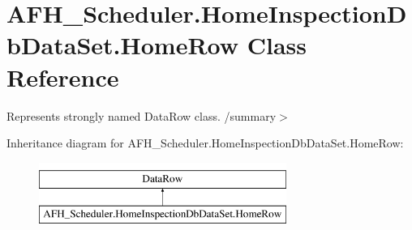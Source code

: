\section{A\+F\+H\+\_\+\+Scheduler.\+Home\+Inspection\+Db\+Data\+Set.\+Home\+Row Class Reference}
\label{class_a_f_h___scheduler_1_1_home_inspection_db_data_set_1_1_home_row}


Represents strongly named Data\+Row class. /summary$>$  


Inheritance diagram for A\+F\+H\+\_\+\+Scheduler.\+Home\+Inspection\+Db\+Data\+Set.\+Home\+Row\+:\begin{figure}[H]
\begin{center}
\leavevmode
\includegraphics[height=2.000000cm]{class_a_f_h___scheduler_1_1_home_inspection_db_data_set_1_1_home_row}
\end{center}
\end{figure}
